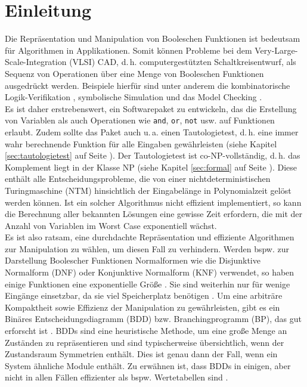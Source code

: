 \section{Einleitung}
\label{sec:einleitung}
Die Repräsentation und Manipulation von Booleschen Funktionen ist bedeutsam für Algorithmen in Applikationen. Somit können Probleme bei dem Very-Large-Scale-Integration (VLSI) CAD, d.\,h. computergestützten Schaltkreisentwurf, als Sequenz von Operationen über eine Menge von Booleschen Funktionen ausgedrückt werden. Beispiele hierfür sind unter anderem die kombinatorische Logik-Verifikation \cite{mwbs1988},  symbolische Simulation \cite{c1988} und das Model Checking \cite{rk2017}.\\
Es ist daher erstrebenswert, ein Softwarepaket zu entwickeln, das die Erstellung von Variablen als auch Operationen wie \texttt{and}, \texttt{or}, \texttt{not} usw. auf Funktionen erlaubt. Zudem sollte das Paket auch u.\,a. einen Tautologietest, d.\,h. eine immer wahr berechnende Funktion für alle Eingaben gewährleisten (siehe Kapitel \ref{sec:tautologietest} auf Seite \pageref{sec:tautologietest}). Der Tautologietest ist co-NP-vollständig, d.\,h. das Komplement liegt in der Klasse NP (siehe Kapitel \ref{sec:formal} auf Seite \pageref{sec:formal}). Diese enthält alle Entscheidungsprobleme, die von einer nichtdeterministischen Turingmaschine (NTM) hinsichtlich der Eingabelänge in Polynomialzeit gelöst werden können. Ist ein solcher Algorithmus nicht effizient implementiert, so kann die Berechnung aller bekannten Lösungen eine gewisse Zeit erfordern, die mit der Anzahl von Variablen im Worst Case exponentiell wächst.\\
Es ist also ratsam, eine durchdachte Repräsentation und effiziente Algorithmen zur Manipulation zu wählen, um diesen Fall zu verhindern. Werden bspw. zur Darstellung Boolescher Funktionen Normalformen wie die Disjunktive Normalform (DNF) oder Konjunktive Normalform (KNF) verwendet, so haben einige Funktionen eine exponentielle Größe \cite{bmhs1984}. Sie sind weiterhin nur für wenige Eingänge einsetzbar, da sie viel Speicherplatz benötigen \cite[S.394-395]{h2014}. Um eine arbiträre Kompaktheit sowie Effizienz der Manipulation zu gewährleisten, gibt es ein Binäres Entscheidungsdiagramm (BDD) bzw. Branchingprogramm (BP), das gut erforscht ist \cite[S.227-240]{fhs1978}. BDDs sind eine heuristische Methode, um eine große Menge an Zuständen zu repräsentieren und sind typischerweise übersichtlich, wenn der Zustandsraum Symmetrien enthält. Dies ist genau dann der Fall, wenn ein System ähnliche Module enthält. Zu erwähnen ist, dass BDDs in einigen, aber nicht in allen Fällen effizienter als bspw. Wertetabellen sind \cite[S.46]{s2007}.\\
